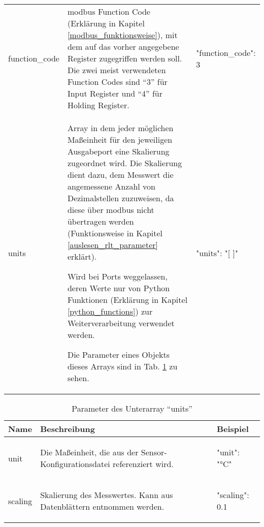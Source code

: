 \begin{enumerate}
\begin{longtable}[h]{p{} p{} | p{}}
    function\_code 	& \gls{modbus} Function Code (Erklärung in Kapitel \ref{modbus_funktionsweise}), mit dem auf das vorher angegebene Register zugegriffen werden soll. Die zwei meist verwendeten Function Codes sind \enquote{3} für Input Register und \enquote{4} für Holding Register. & 
    \begin{jsonTable}
"function_code": 3
    \end{jsonTable} 
    \\
    units 	& Array in dem jeder möglichen Maßeinheit für den jeweiligen Ausgabeport eine Skalierung zugeordnet wird. Die Skalierung dient \zB dazu, dem Messwert die angemessene Anzahl von Dezimalstellen zuzuweisen, da diese über \gls{modbus} nicht übertragen werden (Funktionsweise in Kapitel \ref{auslesen_rlt_parameter} erklärt).
    
    Wird bei Ports weggelassen, deren Werte nur von Python Funktionen (Erklärung in Kapitel \ref{python_functions}) zur Weiterverarbeitung verwendet werden. 
    
    Die Parameter eines Objekts dieses Arrays sind in Tab. \ref{tab:units_array_parameter} zu sehen.  & 
    \begin{jsonTable}
"units": "[ ]"
    \end{jsonTable} 
    \\
\end{longtable}

	
	
\begin{table}[H]
    \caption{Parameter des Unterarray \enquote{units}}
    \label{tab:units_array_parameter}
    \begin{tabular}{p{} p{} | p{}}
        \toprule
        \textbf{Name} & \textbf{Beschreibung} & \textbf{Beispiel} \\
        \midrule
        unit      	& Die Maßeinheit, die aus der Sensor-Konfigurationsdatei referenziert wird. & 
        \begin{jsonTable}
"unit": "°C"
        \end{jsonTable} 
        \\
        scaling 	& Skalierung des Messwertes. Kann aus Datenblättern entnommen werden. & 
        \begin{jsonTable}
"scaling": 0.1
        \end{jsonTable} 
        \\
        \bottomrule
    \end{tabular}
\end{table}
		

\end{enumerate}
